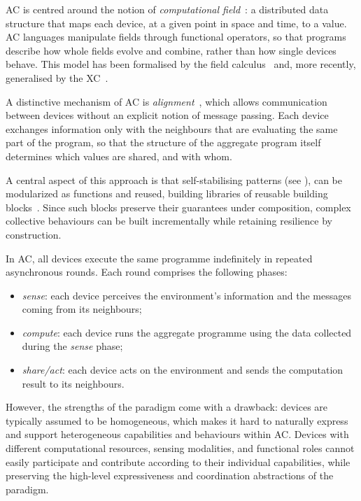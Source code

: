 \ac{AC} is centred around the notion of \emph{computational field}~\cite{DBLP:journals/tocl/AudritoVDPB19}:
a distributed data structure that maps each device,
at a given point in space and time,
to a value.
%
\ac{AC} languages manipulate fields through functional operators,
so that programs describe how whole fields evolve and combine,
rather than how single devices behave.
%
This model has been formalised by the field calculus~\cite{viroli2019jlap}
and, more recently, generalised by the \acf{XC}~\cite{audrito2024jss}.

A distinctive mechanism of \ac{AC} is \emph{alignment}~\cite{audrito2016saso},
which allows communication between devices
without an explicit notion of message passing.
%
Each device exchanges information only with the neighbours
that are evaluating the same part of the program,
so that the structure of the aggregate program itself
determines which values are shared, and with whom.

A central aspect of this approach is
that self-stabilising patterns (see ),
can be modularized as functions and reused,
building libraries of reusable building blocks~\cite{DBLP:journals/tomacs/ViroliABDP18}.
%
Since such blocks preserve their guarantees under composition,
complex collective behaviours can be built incrementally
while retaining resilience by construction.

In \ac{AC},
all devices execute the same programme indefinitely in repeated asynchronous rounds.
%
Each round comprises the following phases:
\begin{itemize}
  \item \emph{sense}:
  each device perceives
  the environment's information and the messages coming from its neighbours;
  \item \emph{compute}:
  each device runs the aggregate programme
  using the data collected during the \emph{sense} phase;
  \item \emph{share/act}:
  each device acts on the environment
  and sends the computation result to its neighbours.
\end{itemize}

However,
the strengths of the paradigm come with a drawback:
devices are typically assumed to be homogeneous,
which makes it hard to naturally express and support
heterogeneous capabilities and behaviours within \ac{AC}.
%
Devices with different computational resources,
sensing modalities,
and functional roles
cannot easily participate and contribute according to their individual capabilities,
while preserving the high-level expressiveness and coordination abstractions of the paradigm.

